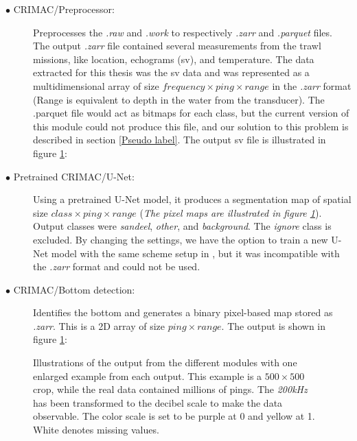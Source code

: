             \begin{description}
              \item[$\bullet$ CRIMAC/Preprocessor:] Preprocesses the \textit{.raw} and \textit{.work} to respectively \textit{.zarr} and \textit{.parquet} files. The output \textit{.zarr} file contained several measurements from the trawl missions, like location, echograms (\gls{sv}), and temperature. The data extracted for this thesis was the \gls{sv} data and was represented as a multidimensional array of size $frequency \times ping \times range$ in the  \textit{.zarr} format (Range is equivalent to depth in the water from the transducer).  The .parquet file would act as bitmaps for each class, but the current version of this module could not produce this file, and our solution to this problem is described in section \ref{Pseudo label}. The output \gls{sv} file is illustrated in figure \ref{Module_outputs_illustration_fig}:
                
              \item[$\bullet$ Pretrained CRIMAC/U-Net:] Using a pretrained U-Net model, it produces a segmentation map of spatial size $class \times ping \times range$ (\textit{The pixel maps are illustrated in figure \ref{Module_outputs_illustration_fig}}). Output classes were \textit{sandeel}, \textit{other}, and \textit{background}. The \textit{ignore} class is excluded. By changing the settings, we have the option to train a new U-Net model with the same scheme setup in \citeauthor{brautaset2020acoustic}, but it was incompatible with the \textit{.zarr} format and could not be used.
              
              \item[$\bullet$ CRIMAC/Bottom detection:] Identifies the bottom and generates a binary pixel-based map stored as \textit{.zarr}. This is a 2D array of size $ping \times range$. The output is shown in figure \ref{Module_outputs_illustration_fig}:

            \end{description}
            
        
        \begin{figure}[H]
            \centering
            
            \caption[Module outputs illustration]{Illustrations of the output from the different modules with one enlarged example from each output. This example is a $500\times500$ crop, while the real data contained millions of pings. The \textit{200kHz} has been transformed to the decibel scale to make the data observable. The color scale is set to be purple at 0 and yellow at 1. White denotes missing values.}
          	\medskip 
            \label{Module_outputs_illustration_fig}
        \end{figure}

